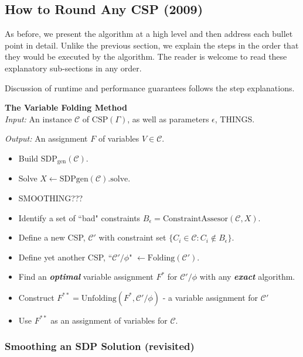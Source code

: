 \documentclass[letterpaper, 12pt]{article}
\numberwithin{equation}{section}
\begin{document}
\subsection{How to Round Any CSP (2009)}
As before, we present the algorithm at a high level and then address each bullet point in detail. Unlike the previous section, we explain the steps in the order that they would be executed by the algorithm. The reader is welcome to read these explanatory sub-sections in any order. 

Discussion of runtime and performance guarantees follows the step explanations.


\begin{algorithm} \textbf{The Variable Folding Method} \\

\textit{Input: } An instance $\mathcal{C}$ of $\text{CSP}(\Gamma)$, as well as parameters $\epsilon$, THINGS.

\textit{Output: } An assignment $F$ of variables $V \in \mathcal{C}$.
\begin{itemize}
\item Build $\text{SDP}_{\text{gen}}(\mathcal{C})$.
\item Solve $X \leftarrow \text{SDPgen}(\mathcal{C}).\text{solve}$.
\item SMOOTHING???
\item Identify a set of ``bad" constraints $B_{\epsilon} = \text{ConstraintAssesor}(\mathcal{C},X)$.
\item Define a new CSP, $\mathcal{C}'$ with constraint set $\{C_i \in \mathcal{C} : C_i \not \in B_{\epsilon}\}$.
\item Define yet another CSP, ``$\mathcal{C}'/\phi$" $ \leftarrow \text{Folding}(\mathcal{C}')$.
\item Find an \textit{\textbf{optimal}} variable assignment $F^*$ for $\mathcal{C}'/\phi$ with any \textit{\textbf{exact}} algorithm.
\item Construct $F^{**} = \text{Unfolding}(F^*, \mathcal{C}'/\phi)$ - a variable assignment for $\mathcal{C}'$
\item Use $F^{**}$ as an assignment of variables for $\mathcal{C}$.
\end{itemize}
\end{algorithm}

\subsubsection{Smoothing an SDP Solution (revisited)}
\end{document}
